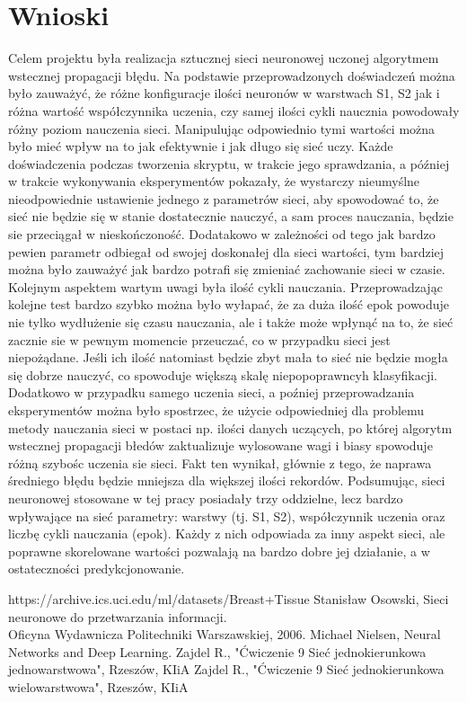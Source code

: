 \documentclass[12pt,twoside]{article}
\begin{document}
\newpage
\section{Wnioski}
Celem projektu była realizacja sztucznej sieci neuronowej uczonej algorytmem wstecznej propagacji błędu.
Na podstawie przeprowadzonych doświadczeń można było zauważyć, że różne konfiguracje ilości neuronów w warstwach S1, S2 jak i różna wartość współczynnika uczenia, czy samej ilości cykli naucznia powodowały różny poziom nauczenia sieci. Manipulując odpowiednio tymi wartości można było mieć wpływ na to jak efektywnie i jak długo się sieć uczy.
Każde doświadczenia podczas tworzenia skryptu, w trakcie jego sprawdzania, a później w trakcie wykonywania eksperymentów pokazały, że wystarczy nieumyślne nieodpowiednie ustawienie jednego z parametrów sieci, aby spowodować to, że sieć nie będzie się w stanie dostatecznie nauczyć, a sam proces nauczania, będzie sie przeciągał w nieskończoność. Dodatakowo w zależności od tego jak bardzo pewien parametr odbiegał od swojej doskonałej dla sieci wartości, tym bardziej można było zauważyć jak bardzo potrafi się zmieniać zachowanie sieci w czasie.
Kolejnym aspektem wartym uwagi była ilość cykli nauczania. Przeprowadzając kolejne test bardzo szybko można było wyłapać, że za duża ilość epok powoduje nie tylko wydłużenie się czasu nauczania, ale i także może wpłynąć na to, że sieć zacznie sie w pewnym momencie przeuczać, co w przypadku sieci jest niepożądane. Jeśli ich ilość natomiast będzie zbyt mała to sieć nie będzie mogła się dobrze nauczyć, co spowoduje większą skalę niepopoprawncyh klasyfikacji.
Dodatkowo w przypadku samego uczenia sieci, a poźniej przeprowadzania eksperymentów można było spostrzec, że użycie odpowiedniej dla problemu metody nauczania sieci w postaci np. ilości danych uczących, po której algorytm wstecznej propagacji błedów zaktualizuje wylosowane wagi i biasy spowoduje różną szybośc uczenia sie sieci. Fakt ten wynikał, głównie z tego, że naprawa średniego błędu będzie mniejsza dla większej ilości rekordów.
Podsumując, sieci neuronowej stosowane w tej pracy posiadały trzy oddzielne, lecz bardzo wpływające na sieć parametry: warstwy (tj. S1, S2), współczynnik uczenia oraz liczbę cykli nauczania (epok). Każdy z nich odpowiada za inny aspekt sieci, ale poprawne skorelowane wartości pozwalają na bardzo dobre jej działanie, a w ostateczności predykcjonowanie.


\clearpage


\begin{thebibliography}{4}
 https://archive.ics.uci.edu/ml/datasets/Breast+Tissue
 Stanisław Osowski, Sieci neuronowe do przetwarzania informacji. \\ Oficyna Wydawnicza Politechniki Warszawskiej, 2006.
 Michael Nielsen, Neural Networks and Deep Learning.
 Zajdel R., "Ćwiczenie 9 Sieć jednokierunkowa jednowarstwowa", Rzeszów, KIiA
 Zajdel R., "Ćwiczenie 9 Sieć jednokierunkowa wielowarstwowa", Rzeszów, KIiA
\end{thebibliography}
\end{document}
